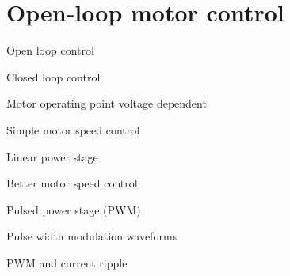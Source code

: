 \documentclass[compress]{beamer}
\begin{document}
\section[Open-loop control]{Open-loop motor control}

{
    \begin{frame}{Open loop control}
    \end{frame}
}
{
    \begin{frame}{Closed loop control}
    \end{frame}
}

{
    \begin{frame}{Motor operating point voltage dependent}
    \end{frame}
}

{
    \begin{frame}{Simple motor speed control}
    \end{frame}
}

{
    \begin{frame}{Linear power stage}
    \end{frame}
}

{
    \begin{frame}{Better motor speed control}
    \end{frame}
}

{
    \begin{frame}{Pulsed power stage (PWM)}
    \end{frame}
}

{
    \begin{frame}{Pulse width modulation waveforms}
    \end{frame}
}

{
    \begin{frame}{PWM and current ripple}
    \end{frame}
}
\end{document}
